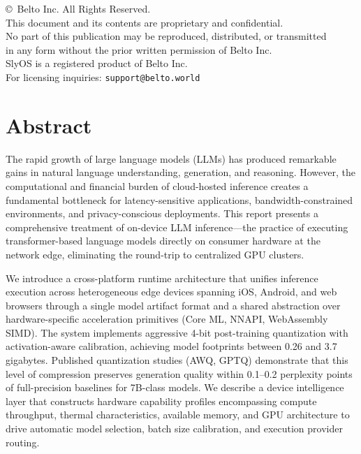 \documentclass[12pt, letterpaper, twoside]{report}
\begin{document}
\thispagestyle{empty}
\vspace*{\fill}
\begin{center}
{\small
\copyright\ Belto Inc. All Rights Reserved.\\[10pt]
This document and its contents are proprietary and confidential.\\
No part of this publication may be reproduced, distributed, or transmitted\\
in any form without the prior written permission of Belto Inc.\\[14pt]
SlyOS is a registered product of Belto Inc.\\[6pt]
For licensing inquiries: \texttt{support@belto.world}
}
\end{center}
\vspace*{\fill}
\clearpage

\chapter*{Abstract}

The rapid growth of large language models (LLMs) has produced remarkable gains in natural language understanding, generation, and reasoning. However, the computational and financial burden of cloud-hosted inference creates a fundamental bottleneck for latency-sensitive applications, bandwidth-constrained environments, and privacy-conscious deployments. This report presents a comprehensive treatment of on-device LLM inference---the practice of executing transformer-based language models directly on consumer hardware at the network edge, eliminating the round-trip to centralized GPU clusters.

We introduce a cross-platform runtime architecture that unifies inference execution across heterogeneous edge devices spanning iOS, Android, and web browsers through a single model artifact format and a shared abstraction over hardware-specific acceleration primitives (Core ML, NNAPI, WebAssembly SIMD). The system implements aggressive 4-bit post-training quantization with activation-aware calibration, achieving model footprints between 0.26 and 3.7 gigabytes. Published quantization studies (AWQ, GPTQ) demonstrate that this level of compression preserves generation quality within 0.1--0.2 perplexity points of full-precision baselines for 7B-class models. We describe a device intelligence layer that constructs hardware capability profiles encompassing compute throughput, thermal characteristics, available memory, and GPU architecture to drive automatic model selection, batch size calibration, and execution provider routing.
\end{document}
